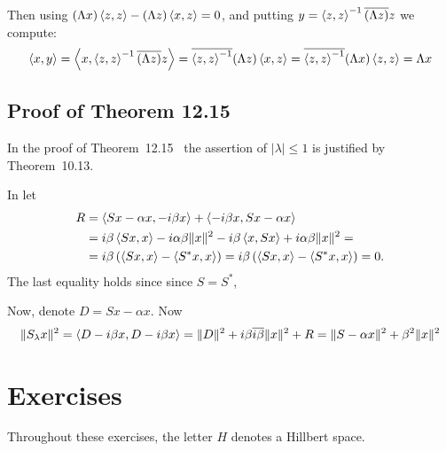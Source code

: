 Then using \((\Lambda x)\left\langle z,z \right\rangle - (\Lambda z)\left\langle x, z \right\rangle = 0\),
and putting \(y = \left\langle z, z \right\rangle^{-1}\overline{\left(\Lambda z\right)}z\)
we compute:
\begin{equation*}
\left\langle x, y \right\rangle
  = \left\langle x, \left\langle z, z \right\rangle^{-1}\overline{\left(\Lambda z\right)}z \right\rangle
  = \overline{\left\langle z, z \right\rangle^{-1}}(\Lambda z)\left\langle x, z \right\rangle
  = \overline{\left\langle z, z \right\rangle^{-1}}(\Lambda x)\left\langle z, z \right\rangle
  = \Lambda x
\end{equation*}
\unfinished

\subsection{Proof of Theorem 12.15}

In the proof of Theorem~12.15~
the assertion of \(|\lambda|\leq 1\)
is justified by Theorem~10.13.

In  let
\begin{align*}
 R &= \left\langle Sx - \alpha x, - i\beta x \right\rangle + \left\langle -i\beta x, Sx - \alpha x \right\rangle\\
  &= i\beta\left\langle Sx, x \right\rangle  -i\alpha\beta \|x\|^2
     -i\beta\left\langle x, Sx \right\rangle + i\alpha\beta \|x\|^2 = \\
  &=  i\beta\left(\left\langle Sx, x \right\rangle - \left\langle S^*x, x \right\rangle\right) 
   =  i\beta\left(\left\langle Sx, x \right\rangle - \left\langle S^*x, x \right\rangle\right) = 0.
\end{align*}
The last equality holds since since \(S=S^*\),

Now, denote \(D = Sx - \alpha x\). Now
\begin{equation*}
\|S_\lambda x\|^2 = \left\langle D - i\beta x, D - i\beta x \right\rangle 
  = \|D\|^2 + i\beta \overline{i\beta} \|x\|^2 + R 
  = \|S - \alpha x\|^2 + \beta^2 \|x\|^2 
\end{equation*}


\section{Exercises} %

Throughout these exercises, the letter $H$ denotes a Hillbert space.

